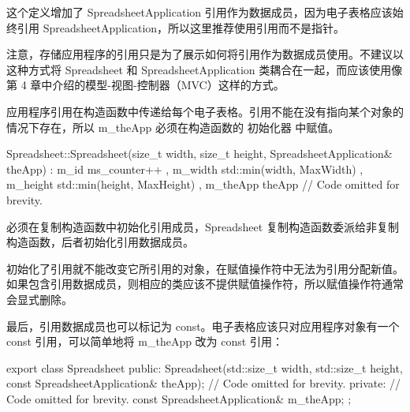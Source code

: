 这个定义增加了 SpreadsheetApplication 引用作为数据成员，因为电子表格应该始终引用 SpreadsheetApplication，所以这里推荐使用引用而不是指针。

注意，存储应用程序的引用只是为了展示如何将引用作为数据成员使用。不建议以这种方式将 Spreadsheet 和 SpreadsheetApplication 类耦合在一起，而应该使用像第 4 章中介绍的模型-视图-控制器（MVC）这样的方式。

应用程序引用在构造函数中传递给每个电子表格。引用不能在没有指向某个对象的情况下存在，所以 m\_theApp 必须在构造函数的 初始化器 中赋值。

\begin{cpp}
Spreadsheet::Spreadsheet(size_t width, size_t height,
    SpreadsheetApplication& theApp)
    : m_id { ms_counter++ }
    , m_width { std::min(width, MaxWidth) }
    , m_height { std::min(height, MaxHeight) }
    , m_theApp { theApp }
{
    // Code omitted for brevity.
}
\end{cpp}

必须在复制构造函数中初始化引用成员，Spreadsheet 复制构造函数委派给非复制构造函数，后者初始化引用数据成员。

初始化了引用就不能改变它所引用的对象，在赋值操作符中无法为引用分配新值。如果包含引用数据成员，则相应的类应该不提供赋值操作符，所以赋值操作符通常会显式删除。

最后，引用数据成员也可以标记为 const。电子表格应该只对应用程序对象有一个 const 引用，可以简单地将 m\_theApp 改为 const 引用：

\begin{cpp}
export class Spreadsheet
{
    public:
        Spreadsheet(std::size_t width, std::size_t height,
            const SpreadsheetApplication& theApp);
        // Code omitted for brevity.
    private:
        // Code omitted for brevity.
        const SpreadsheetApplication& m_theApp;
};
\end{cpp}



